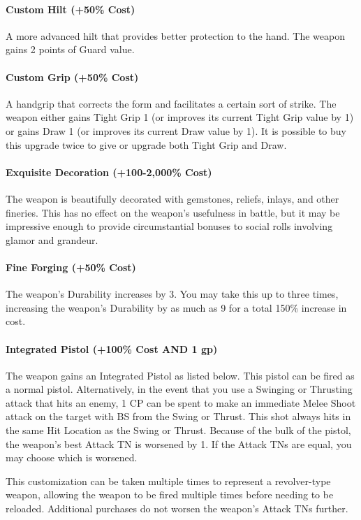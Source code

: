 \documentclass[oneside,11pt,english]{book}
\begin{document}
\paragraph{Custom Hilt (+50\% Cost)}\par
A more advanced hilt that provides better protection to the hand. The weapon gains 2 points of Guard value.
\paragraph{Custom Grip (+50\% Cost)}\par
A handgrip that corrects the form and facilitates a certain sort of strike. The weapon either gains Tight Grip 1 (or improves its current Tight Grip value by 1) or gains Draw 1 (or improves its current Draw value by 1). It is possible to buy this upgrade twice to give or upgrade both Tight Grip and Draw.
\paragraph{Exquisite Decoration (+100-2,000\% Cost)}\par
The weapon is beautifully decorated with gemstones, reliefs, inlays, and other fineries. This has no effect on the weapon’s usefulness in battle, but it may be impressive enough to provide circumstantial bonuses to social rolls involving glamor and grandeur.
\paragraph{Fine Forging (+50\% Cost)}\par
The weapon’s Durability increases by 3. You may take this up to three times, increasing the weapon’s Durability by as much as 9 for a total 150\% increase in cost.
\paragraph{Integrated Pistol (+100\% Cost AND 1 gp)}
The weapon gains an Integrated Pistol as listed below. This pistol can be fired as a normal pistol. Alternatively, in the event that you use a Swinging or Thrusting attack that hits an enemy, 1 CP can be spent to make an immediate Melee Shoot attack on the target with BS from the Swing or Thrust. This shot always hits in the same Hit Location as the Swing or Thrust. Because of the bulk of the pistol, the weapon’s best Attack TN is worsened by 1. If the Attack TNs are equal, you may choose which is worsened.

This customization can be taken multiple times to represent a revolver-type weapon, allowing the weapon to be fired multiple times before needing to be reloaded. Additional purchases do not worsen the weapon’s Attack TNs further.
\end{document}
